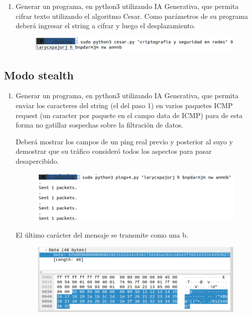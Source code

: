 \documentclass[letter,12pt]{article}
\begin{document}
\begin{enumerate}
\item Generar un programa, en python3 utilizando IA Generativa, que permita cifrar texto utilizando el algoritmo Cesar. Como parámetros de su programa deberá ingresar el string a cifrar y luego el desplazamiento.

\begin{figure}[H]
        \centering
        \includegraphics[width=15cm]{actividades/A1.png}
        \label{fig:a1}
\end{figure}

\end{enumerate}

\subsection{Modo stealth}

\begin{enumerate}
    \item Generar un programa, en python3 utilizando IA Generativa, que permita enviar los caracteres del string (el del paso 1) en varios paquetes ICMP request (un caracter por paquete en el campo data de ICMP) para de esta forma no gatillar sospechas sobre la filtración de datos.

Deberá mostrar los campos de un ping real previo y posterior al suyo y demostrar que su tráfico consideró todos los aspectos para pasar desapercibido.

    \begin{figure}[H]
        \centering
        \includegraphics[width=15cm]{actividades/A2.1.png}
        \label{fig:a2-1}
    \end{figure}
    
    El último carácter del mensaje se transmite como una b.
    
    \begin{figure}[H]
            \centering
            \includegraphics[width=15cm]{actividades/A2.2.png}
            \label{fig:a2-2}
        \end{figure}
\end{enumerate}
\end{document}
